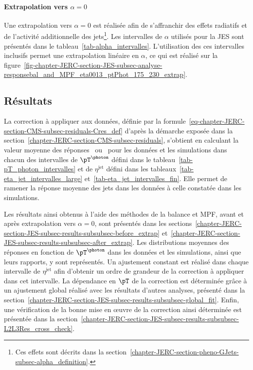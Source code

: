 \paragraph{Extrapolation vers $\alpha=0$}
Une extrapolation vers $\alpha=0$ est réalisée afin de s'affranchir des effets radiatifs et de l'activité additionnelle des jets\footnote{Ces effets sont décrits dans la section~\ref{chapter-JERC-section-pheno-GJets-subsec-alpha_definition}.}.
Les intervalles de $\alpha$ utilisés pour la JES sont présentés dans le tableau~\ref{tab-alpha_intervalles}.
L'utilisation des ces intervalles inclusifs permet une extrapolation linéaire en $\alpha$, ce qui est réalisé sur la figure~\ref{fig-chapter-JERC-section-JES-subsec-analyse-responsebal_and_MPF_eta0013_ptPhot_175_230_extrap}.


\clearpage
\subsection{Résultats}\label{chapter-JERC-section-JES-subsec-results}
La correction à appliquer aux données, définie par la formule~\eqref{eq-chapter-JERC-section-CMS-subsec-residuals-Cres_def} d'après la démarche exposée dans la section~\ref{chapter-JERC-section-CMS-subsec-residuals}, s'obtient en calculant la valeur moyenne des réponses \Rbal\ ou \RMPF\ pour les données et les simulations dans chacun des intervalles
de $\pT^{\photon}$ défini dans le tableau~\ref{tab-pT_photon_intervalles} et
de $\eta^\text{jet}$ défini dans les tableaux~\ref{tab-eta_jet_intervalles_large} et~\ref{tab-eta_jet_intervalles_fin}.
Elle permet de ramener la réponse moyenne des jets dans les données à celle constatée dans les simulations.
\par Les résultats ainsi obtenus à l'aide des méthodes de la balance et MPF, avant et après extrapolation vers $\alpha=0$, sont présentés dans les sections~\ref{chapter-JERC-section-JES-subsec-results-subsubsec-before_extrap} et~\ref{chapter-JERC-section-JES-subsec-results-subsubsec-after_extrap}.
Les distributions moyennes des réponses en fonction de $\pT^{\photon}$ dans les données et les simulations, ainsi que leurs rapports, y sont représentés.
Un ajustement constant est réalisé dans chaque intervalle de $\eta^\text{jet}$ afin d'obtenir un ordre de grandeur de la correction à appliquer dans cet intervalle.
La dépendance en $\pT$ de la correction est déterminée grâce à un ajustement global réalisé avec les résultats d'autres analyses, présenté dans la section~\ref{chapter-JERC-section-JES-subsec-results-subsubsec-global_fit}.
Enfin, une vérification de la bonne mise en œuvre de la correction ainsi déterminée est présentée dans la section~\ref{chapter-JERC-section-JES-subsec-results-subsubsec-L2L3Res_cross_check}.
